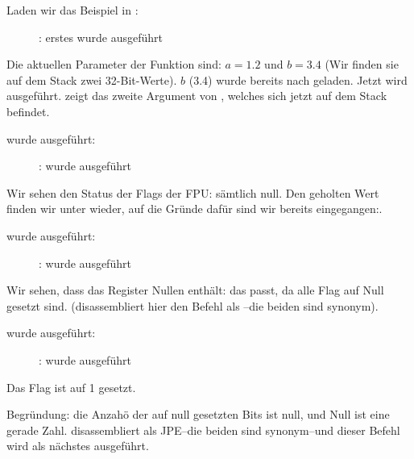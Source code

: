 \clearpage
{}
\myindex{\olly}

Laden wir das Beispiel in \olly:

\begin{figure}[H]
\centering
{}
\caption{\olly: erstes \FLD wurde ausgeführt}
\label{fig:FPU_comparison_case1_olly1}
\end{figure}
Die aktuellen Parameter der Funktion sind: $a=1.2$ und $b=3.4$ (Wir finden sie
auf dem Stack zwei 32-Bit-Werte). $b$ (3.4) wurde bereits nach  geladen.
Jetzt wird \FCOMP ausgeführt. 
\olly zeigt das zweite Argument von \FCOMP, welches sich jetzt auf dem Stack
befindet.

\clearpage
\FCOMP wurde ausgeführt:

\begin{figure}[H]
\centering
{}
\caption{\olly: \FCOMP wurde ausgeführt}
\label{fig:FPU_comparison_case1_olly2}
\end{figure}
Wir sehen den Status der Flags der \ac{FPU}: sämtlich null. 
Den geholten Wert finden wir unter  wieder, auf die Gründe dafür sind
wir bereits eingegangen:.

\clearpage
\FNSTSW wurde ausgeführt:
\begin{figure}[H]
\centering
{}
\caption{\olly: \FNSTSW wurde ausgeführt}
\label{fig:FPU_comparison_case1_olly3}
\end{figure}
Wir sehen, dass das  Register Nullen enthält: das passt, da alle Flag
auf Null gesetzt sind. (\olly disassembliert hier den Befehl \FNSTSW als
--die beiden sind synonym).

\clearpage
\TEST wurde ausgeführt:

\begin{figure}[H]
\centering
{}
\caption{\olly: \TEST wurde ausgeführt}
\label{fig:FPU_comparison_case1_olly4}
\end{figure}

Das  Flag ist auf 1 gesetzt.

Begründung: die Anzahö der auf null gesetzten Bits ist null, und Null ist eine
gerade Zahl.
\olly disassembliert  als \ac{JPE}--die beiden sind synonym--und dieser
Befehl wird als nächstes ausgeführt.

